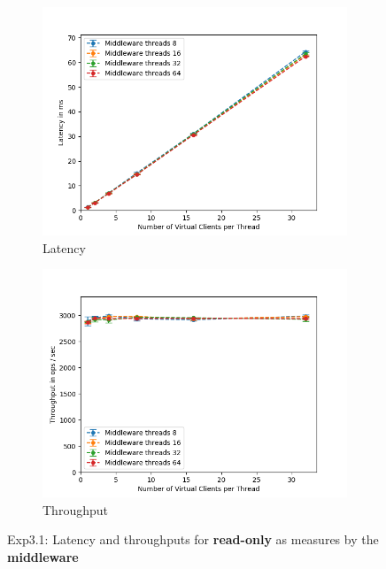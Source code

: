 \documentclass[11pt,a4paper]{article}
\begin{document}
\begin{figure}[H]
\centering
\begin{subfigure}{.5\textwidth}
    \centering
    \includegraphics[width=\textwidth]{img/exp3_1/exp3_1__latency_middleware_write_0.png}
    \caption{Latency}
    \label{fig:mesh1}
\end{subfigure}%
\begin{subfigure}{.5\textwidth}
      \centering
    \includegraphics[width=\textwidth]{img/exp3_1/exp3_1__throughput_middleware_write_0.png}
    \caption{Throughput}
    \label{fig:mesh1}
\end{subfigure}
\caption{Exp3.1: Latency and throughputs for \textbf{read-only} as measures by the \textbf{middleware}}
\label{fig:test}
\end{figure}
\end{document}
